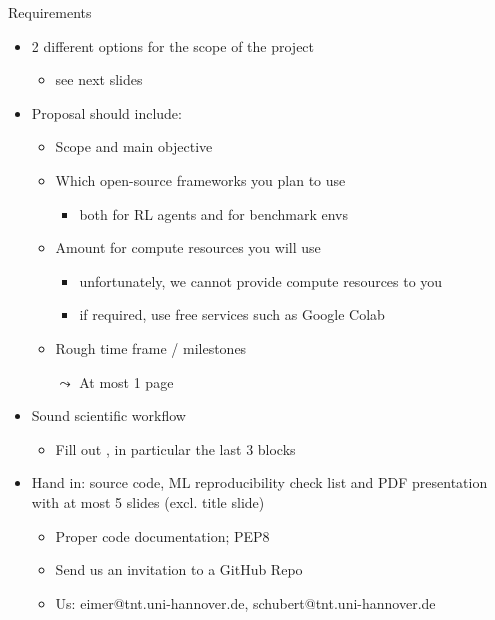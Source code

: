 \begin{frame}[c]{Requirements}
	
	\begin{itemize}
		\item 2 different options for the scope of the project 
		\begin{itemize}
			\item see next slides
		\end{itemize}
		\pause
		\item Proposal should include:
			\begin{itemize}
				\item Scope and main objective
				\item Which open-source frameworks you plan to use
				\begin{itemize}
					\item both for RL agents and for benchmark envs
				\end{itemize}
				\item Amount for compute resources you will use
				\begin{itemize}
					\item unfortunately, we cannot provide compute resources to you
					\item if required, use free services such as Google Colab 
				\end{itemize}
				\item Rough time frame / milestones
				\item[$\leadsto$] At most 1 page
			\end{itemize}
		\pause
		\item Sound scientific  workflow
		\begin{itemize}
			\item Fill out , in particular the last 3 blocks
		\end{itemize}
		\pause
		\item Hand in: source code, ML reproducibility check list and PDF presentation with at most 5 slides (excl. title slide)
		\begin{itemize}
			\item Proper code documentation; PEP8
			\item Send us an invitation to a GitHub Repo
			\item Us: eimer@tnt.uni-hannover.de, schubert@tnt.uni-hannover.de
		\end{itemize}
	\end{itemize}
	
\end{frame}
